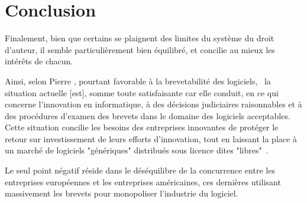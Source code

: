 \documentclass[pdftex,a4paper,11pt]{report}
\begin{document}
\chapter*{Conclusion}
Finalement, bien que certains se plaignent des limites du système du droit d'auteur, il semble particulièrement bien équilibré, et concilie au mieux les intérêts de chacun.

Ainsi, selon Pierre , pourtant favorable à la brevetabilité des logiciels, \og~la situation  actuelle [est], somme toute satisfaisante car elle conduit, en ce qui concerne l'innovation en informatique, à des décisions judiciaires raisonnables et à des procédures d'examen des brevets dans le domaine des logiciels acceptables. Cette situation concilie les besoins des entreprises innovantes de protéger le retour sur investissement de leurs efforts d'innovation, tout en laissant la place à un marché de logiciels "génériques" distribués sous licence dites "libres"~\fg.

Le seul point négatif réside dans le déséquilibre de la concurrence entre les entreprises européennes et les entreprises américaines, ces dernières utilisant massivement les brevets pour monopoliser l'industrie du logiciel.

\tableofcontents
\end{document}
